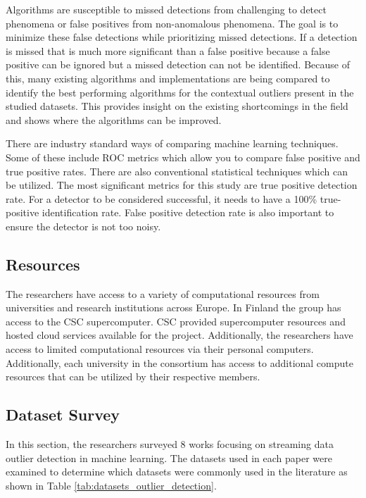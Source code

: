 Algorithms are susceptible to missed detections from challenging to detect phenomena or false positives from non-anomalous phenomena. The goal is to minimize these false detections while prioritizing missed detections. If a detection is missed that is much more significant than a false positive because a false positive can be ignored but a missed detection can not be identified. Because of this, many existing algorithms and implementations are being compared to identify the best performing algorithms for the contextual outliers present in the studied datasets. This provides insight on the existing shortcomings in the field and shows where the algorithms can be improved.

There are industry standard ways of comparing machine learning techniques. Some of these include ROC metrics which allow you to compare false positive and true positive rates. There are also conventional statistical techniques which can be utilized. The most significant metrics for this study are true positive detection rate. For a detector to be considered successful, it needs to have a 100\% true-positive identification rate. False positive detection rate is also important to ensure the detector is not too noisy.

\subsection{Resources}

The researchers have access to a variety of computational resources from universities and research institutions across Europe. In Finland the group has access to the CSC supercomputer. CSC provided supercomputer resources and hosted cloud services available for the project. Additionally, the researchers have access to limited computational resources via their personal computers. Additionally, each university in the consortium has access to additional compute resources that can be utilized by their respective members.

\subsection{Dataset Survey}
\label{ref_dataset_survey}

In this section, the researchers surveyed 8 works focusing on streaming data outlier detection in machine learning. The datasets used in each paper were examined to determine which datasets were commonly used in the literature as shown in Table \ref{tab:datasets_outlier_detection}.


